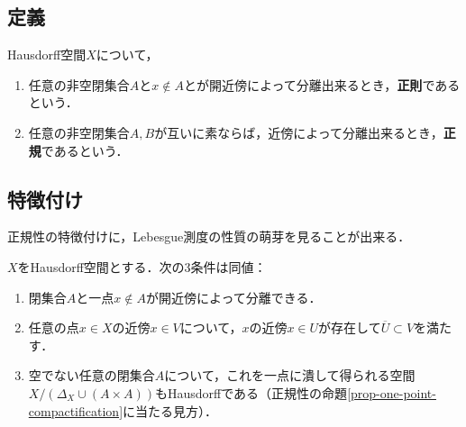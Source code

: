 \documentclass[uplatex,dvipdfmx]{jsreport}
\begin{document}
\subsection{定義}

\begin{definition}
    Hausdorff空間$X$について，
    \begin{enumerate}
        \item 任意の非空閉集合$A$と$x\notin A$とが開近傍によって分離出来るとき，\textbf{正則}であるという．
        \item 任意の非空閉集合$A,B$が互いに素ならば，近傍によって分離出来るとき，\textbf{正規}であるという．
    \end{enumerate}
\end{definition}

\subsection{特徴付け}

\begin{tcolorbox}[colframe=ForestGreen, colback=ForestGreen!10!white,breakable,colbacktitle=ForestGreen!40!white,coltitle=black,fonttitle=\bfseries\sffamily,
title=]
    正規性の特徴付けに，Lebesgue測度の性質の萌芽を見ることが出来る．
\end{tcolorbox}

\begin{proposition}[正則性の特徴付け]
    $X$をHausdorff空間とする．次の3条件は同値：
    \begin{enumerate}
        \item 閉集合$A$と一点$x\notin A$が開近傍によって分離できる．
        \item 任意の点$x\in X$の近傍$x\in V$について，$x$の近傍$x\in U$が存在して$\overline{U}\subset V$を満たす．
        \item 空でない任意の閉集合$A$について，これを一点に潰して得られる空間$X/(\Delta_X\cup(A\times A))$もHausdorffである（正規性の命題\ref{prop-one-point-compactification}に当たる見方）．
    \end{enumerate}
\end{proposition}
\end{document}
